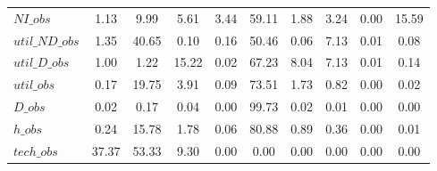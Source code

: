\begin{center}
\begin{longtable}{lccccccccc}
$NI\_obs        $	 & 	         1.13	 & 	         9.99	 & 	         5.61	 & 	         3.44	 & 	        59.11	 & 	         1.88	 & 	         3.24	 & 	         0.00	 & 	        15.59 \\ 
$util\_ND\_obs  $	 & 	         1.35	 & 	        40.65	 & 	         0.10	 & 	         0.16	 & 	        50.46	 & 	         0.06	 & 	         7.13	 & 	         0.01	 & 	         0.08 \\ 
$util\_D\_obs   $	 & 	         1.00	 & 	         1.22	 & 	        15.22	 & 	         0.02	 & 	        67.23	 & 	         8.04	 & 	         7.13	 & 	         0.01	 & 	         0.14 \\ 
$util\_obs      $	 & 	         0.17	 & 	        19.75	 & 	         3.91	 & 	         0.09	 & 	        73.51	 & 	         1.73	 & 	         0.82	 & 	         0.00	 & 	         0.02 \\ 
$D\_obs         $	 & 	         0.02	 & 	         0.17	 & 	         0.04	 & 	         0.00	 & 	        99.73	 & 	         0.02	 & 	         0.01	 & 	         0.00	 & 	         0.00 \\ 
$h\_obs         $	 & 	         0.24	 & 	        15.78	 & 	         1.78	 & 	         0.06	 & 	        80.88	 & 	         0.89	 & 	         0.36	 & 	         0.00	 & 	         0.01 \\ 
$tech\_obs      $	 & 	        37.37	 & 	        53.33	 & 	         9.30	 & 	         0.00	 & 	         0.00	 & 	         0.00	 & 	         0.00	 & 	         0.00	 & 	         0.00 \\ 
\end{longtable}
 \end{center}
